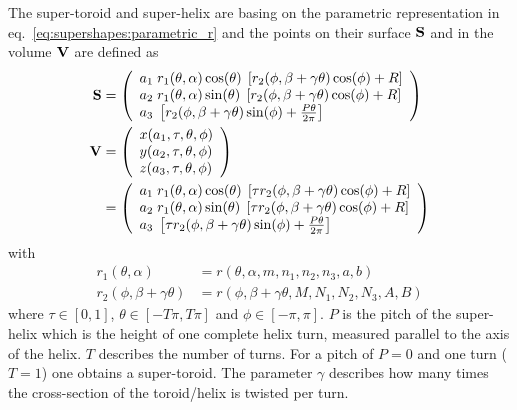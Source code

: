 The super-toroid and super-helix are basing on the parametric representation in eq.\ \ref{eq:supershapes:parametric_r} and the points on their surface $ \B{S}$ and in the volume $ \B{V}$ are defined as
\begin{align}\label{eq:super_toroid_helix}
  \B{S} &=
  \left(
    \begin{array}{l}
     a_1 \; r_1(\theta,\alpha) \cos(\theta) \; \left[r_2(\phi,\beta+\gamma\theta)\cos(\phi) +R\right]  \\
     a_2 \; r_1(\theta,\alpha) \sin(\theta) \; \left[r_2(\phi,\beta+\gamma\theta)\cos(\phi) +R\right]  \\
     a_3 \; \left[r_2(\phi,\beta+\gamma\theta)   \sin(\phi)+\frac{P\theta}{2\pi} \right]\\
    \end{array}
  \right) \\
\B{V} &  = \left(
    \begin{array}{l}
      x(a_1,\tau,\theta,\phi) \\
      y(a_2,\tau,\theta,\phi) \\
      z(a_3,\tau,\theta,\phi) \\
    \end{array}
    \right) \nonumber \\
    &=
  \left(
    \begin{array}{l}
     a_1 \; r_1(\theta,\alpha) \cos(\theta) \; \left[\tau r_2(\phi,\beta+\gamma\theta)\cos(\phi) +R\right]  \\
     a_2 \; r_1(\theta,\alpha) \sin(\theta) \; \left[\tau r_2(\phi,\beta+\gamma\theta)\cos(\phi) +R\right]  \\
     a_3 \; \left[\tau r_2(\phi,\beta+\gamma\theta)   \sin(\phi)+\frac{P\theta}{2\pi} \right]\\
    \end{array}
  \right)
\end{align}
with
\begin{align} \label{eq:supershapes:parametric_r1}
r_1(\theta,\alpha) &= r(\theta,\alpha,m,n_1,n_2,n_3,a,b) \\
\label{eq:supershapes:parametric_r2}
r_2(\phi,\beta+\gamma\theta)   &= r(\phi,  \beta+\gamma\theta, M,N_1,N_2,N_3,A,B)
\end{align}
where $\tau\in[0,1]$, $\theta\in[-T\pi,T\pi]$ and $\phi\in\left[-\pi,\pi\right]$. $P$ is the pitch of the super-helix which is the height of one complete helix turn, measured parallel to the axis of the helix. $T$ describes the number of turns. For a pitch of $P=0$ and one turn ($T=1$) one obtains a super-toroid. The parameter $\gamma$ describes how many times the cross-section of the toroid/helix is twisted per turn.
